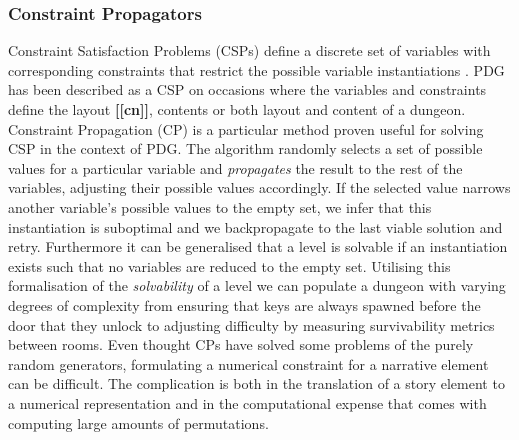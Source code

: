 \documentclass{UoYCSproject}
\begin{document}
\subsubsection{Constraint Propagators}
Constraint Satisfaction Problems (CSPs) define a discrete set of variables with corresponding constraints that restrict the possible variable instantiations \parencite{kumar1992CPalgorithms}. PDG has been described as a CSP on occasions where the variables and constraints define the layout \textbf{[[cn]]}, contents \parencite{HorswillCSPMission} or both layout and content \parencite{GreenCSPboth} of a dungeon. Constraint Propagation (CP) is a particular method proven useful for solving CSP in the context of PDG. The algorithm randomly selects a set of possible values for a particular variable and \textit{propagates} the result to the rest of the variables, adjusting their possible values accordingly. If the selected value narrows another variable's possible values to the empty set, we infer that this instantiation is suboptimal and we backpropagate to the last viable solution and retry. Furthermore it can be generalised that a level is solvable if an instantiation exists such that no variables are reduced to the empty set. Utilising this formalisation of the \textit{solvability} of a level we can populate a dungeon with varying degrees of complexity from ensuring that keys are always spawned before the door that they unlock to adjusting difficulty by measuring survivability metrics between rooms. Even thought CPs have solved some problems of the purely random generators, formulating a numerical constraint for a narrative element can be difficult. The complication is both in the translation of a story element to a numerical representation and in the computational expense that comes with computing large amounts of permutations.
\end{document}
